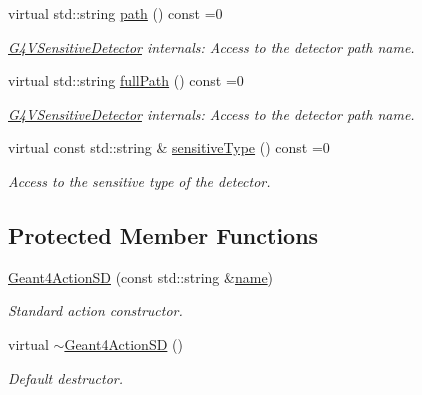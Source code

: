 \begin{DoxyCompactItemize}
virtual std\+::string \hyperlink{class_d_d4hep_1_1_simulation_1_1_geant4_action_s_d_a8d3333538a535ac963931173f15acfeb}{path} () const =0
\begin{DoxyCompactList}\small\item\em \hyperlink{class_g4_v_sensitive_detector}{G4\+V\+Sensitive\+Detector} internals\+: Access to the detector path name. \end{DoxyCompactList}\item 
virtual std\+::string \hyperlink{class_d_d4hep_1_1_simulation_1_1_geant4_action_s_d_afaba405dfb4c663ba2403ad4558d9956}{full\+Path} () const =0
\begin{DoxyCompactList}\small\item\em \hyperlink{class_g4_v_sensitive_detector}{G4\+V\+Sensitive\+Detector} internals\+: Access to the detector path name. \end{DoxyCompactList}\item 
virtual const std\+::string \& \hyperlink{class_d_d4hep_1_1_simulation_1_1_geant4_action_s_d_ad2aec470fc9632ab3082b51b16a75c00}{sensitive\+Type} () const =0
\begin{DoxyCompactList}\small\item\em Access to the sensitive type of the detector. \end{DoxyCompactList}\end{DoxyCompactItemize}
\subsection*{Protected Member Functions}
\begin{DoxyCompactItemize}
\item 
\hyperlink{class_d_d4hep_1_1_simulation_1_1_geant4_action_s_d_ad09cff29caa01d794981f342c0b1632e}{Geant4\+Action\+SD} (const std\+::string \&\hyperlink{class_d_d4hep_1_1_simulation_1_1_geant4_action_af374e70b014d16afb81dd9d77cc3894b}{name})
\begin{DoxyCompactList}\small\item\em Standard action constructor. \end{DoxyCompactList}\item 
virtual \hyperlink{class_d_d4hep_1_1_simulation_1_1_geant4_action_s_d_a535bbf839314d7cdaf37c42712ea96b6}{$\sim$\+Geant4\+Action\+SD} ()
\begin{DoxyCompactList}\small\item\em Default destructor. \end{DoxyCompactList}\end{DoxyCompactItemize}
